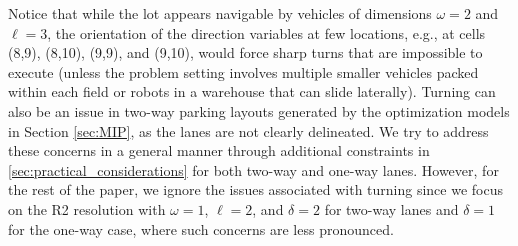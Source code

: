 \documentclass[10pt]{article}
\newcommand{\parkwidth}{\omega}
\newcommand{\parklength}{\ell}
\newcommand{\drivewidth}{\delta}
\theoremstyle{definition}
\begin{document}
Notice that while the lot appears navigable by vehicles of dimensions $\parkwidth =2$ and $\parklength=3$, the orientation of the direction variables at few locations, e.g., at cells (8,9), (8,10), (9,9), and (9,10), would force sharp turns that are impossible to execute (unless the problem setting involves multiple smaller vehicles packed within each field or robots in a warehouse that can slide laterally). Turning can also be an issue in two-way parking layouts generated by the optimization models in Section \ref{sec:MIP}, as the lanes are not clearly delineated. We try to address these concerns in a general manner through additional constraints in \ref{sec:practical_considerations} for both two-way and one-way lanes. However, for the rest of the paper, we ignore the issues associated with turning since we focus on the R2 resolution \citep{stephan2021layout} with $\parkwidth = 1$, $\parklength=2$, and $\drivewidth=2$ for two-way lanes and $\drivewidth=1$ for the one-way case, where such concerns are less pronounced.
\end{document}
